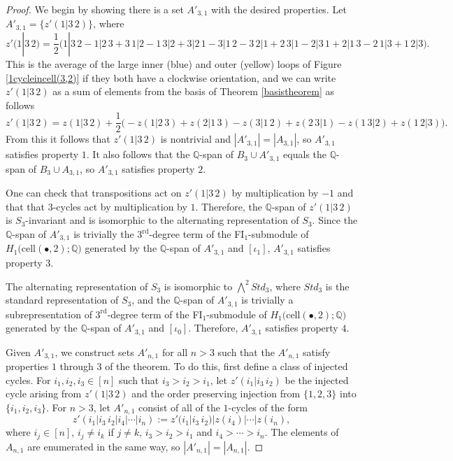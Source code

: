 \documentclass[12py]{amsart}%
\theoremstyle{definition}\newtheorem{definition}[thm]{Definition}
\theoremstyle{definition}
\newcommand{\Q}{\ensuremath{\mathbb{Q}}}
\begin{document}
\begin{proof}
We begin by showing there is a set $A'_{3,1}$ with the desired properties. Let $A'_{3,1}=\{z'(1|3\,2)\}$, where
\[
z'(1|3\,2)=\frac{1}{2}\big(1|3\,2-1|2\,3+3\, 1|2-1\,3|2+3|2\,1-3|1\, 2-3\,2|1+2\,3|1-2|3\,1+2|1\,3-2\,1|3+1\,2|3\big).
\]
This is the average of the large inner (blue) and outer (yellow) loops of Figure \ref{1cycleincell(3,2)} if they both have a clockwise orientation, and we can write $z'(1|3\,2)$ as a sum of elements from the basis of Theorem \ref{basistheorem} as follows
\[
z'(1|3\,2)=z(1|3\,2)+\frac{1}{2}\big(-z(1|2\,3)+z(2|1\,3)-z(3|1\,2)+z(2\,3|1)-z(1\,3|2)+z(1\,2|3)\big).
\]
From this it follows that $z'(1|3\,2)$ is nontrivial and $|A'_{3,1}|=|A_{3,1}|$, so $A'_{3,1}$ satisfies property $1$. It also follows that the $\Q$-span of $B_{3}\cup A'_{3,1}$ equals the $\Q$-span of $B_{3}\cup A_{3,1}$, so $A'_{3,1}$ satisfies property $2$. 

One can check that transpositions act on $z'(1|3\,2)$ by multiplication by $-1$ and that that $3$-cycles act by multiplication by $1$. Therefore, the $\Q$-span of $z'(1|3\,2)$ is $S_{3}$-invariant and is isomorphic to the alternating representation of $S_{3}$. Since the $\Q$-span of $A'_{3,1}$ is trivially the $3^{\text{rd}}$-degree term of the FI$_{1}$-submodule of $H_{1}\big(\text{cell}(\bullet, 2);\Q\big)$ generated by the $\Q$-span of $A'_{3,1}$ and $[\iota_{1}]$, $A'_{3,1}$ satisfies property $3$.

The alternating representation of $S_{3}$ is isomorphic to $\bigwedge^{2}Std_{3}$, where $Std_{3}$ is the standard representation of $S_{3}$, and the $\Q$-span of $A'_{3,1}$ is trivially a subrepresentation of $3^{\text{rd}}$-degree term of the FI$_{1}$-submodule of $H_{1}\big(\text{cell}(\bullet, 2);\Q\big)$ generated by the $\Q$-span of $A'_{3,1}$ and $[\iota_{0}]$. Therefore, $A'_{3,1}$ satisfies property $4$.

Given $A'_{3,1}$, we construct sets $A'_{n,1}$ for all $n>3$ such that the $A'_{n,1}$ satisfy properties $1$ through $3$ of the theorem. To do this, first define a class of injected cycles. For $i_{1}, i_{2}, i_{3}\in [n]$ such that $i_{3}>i_{2}>i_{1}$, let $z'(i_{1}|i_{3}\,i_{2})$ be the injected cycle arising from $z'(1|3\,2)$ and the order preserving injection from $\{1,2,3\}$ into $\{i_{1}, i_{2},i_{3}\}$. For $n>3$, let $A'_{n,1}$ consist of all of the $1$-cycles of the form 
\[
z'(i_{1}|i_{3}\,i_{2}|i_{4}|\cdots|i_{n}):=z'(i_{1}|i_{3}\,i_{2})|z(i_{4})|\cdots|z(i_{n}),
\]
where $i_{j}\in [n]$, $i_{j}\neq i_{k}$ if $j\neq k$, $i_{3}>i_{2}>i_{1}$ and $i_{4}>\cdots>i_{n}$. The elements of $A_{n,1}$ are enumerated in the same way, so $|A'_{n,1}|=|A_{n,1}|$.


\end{proof}
\end{document}
